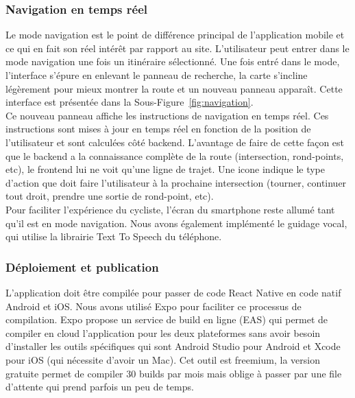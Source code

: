 \subsubsection{Navigation en temps réel}
\label{sec:mobile-navigation}

\noindent Le mode navigation est le point de différence principal de l'application mobile et ce qui en fait son réel intérêt par rapport au site. L'utilisateur peut entrer dans le mode navigation une fois un itinéraire sélectionné. Une fois entré dans le mode, l'interface s'épure en enlevant le panneau de recherche, la carte s'incline légèrement pour mieux montrer la route et un nouveau panneau apparaît. Cette interface est présentée dans la Sous-Figure~\ref{fig:navigation}.\\

\noindent Ce nouveau panneau affiche les instructions de navigation en temps réel. Ces instructions sont mises à jour en temps réel en fonction de la position de l'utilisateur et sont calculées côté backend.
L'avantage de faire de cette façon est que le backend a la connaissance complète de la route (intersection, rond-points, etc), le frontend lui ne voit qu'une ligne de trajet. Une icone indique le type d'action que doit faire l'utilisateur à la prochaine intersection (tourner, continuer tout droit, prendre une sortie de rond-point, etc).\\

\noindent Pour faciliter l'expérience du cycliste, l'écran du smartphone reste allumé tant qu'il est en mode navigation. Nous avons également implémenté le guidage vocal, qui utilise la librairie Text To Speech du téléphone.\\

\subsubsection{Déploiement et publication}

\noindent L'application doit être compilée pour passer de code React Native en code natif Android et iOS. Nous avons utilisé Expo pour faciliter ce processus de compilation. Expo propose un service de build en ligne (EAS) qui permet de compiler en cloud l'application pour les deux plateformes sans avoir besoin d'installer les outils spécifiques qui sont Android Studio pour Android et Xcode pour iOS (qui nécessite d'avoir un Mac). Cet outil est freemium, la version gratuite permet de compiler 30 builds par mois mais oblige à passer par une file d'attente qui prend parfois un peu de temps.\\

